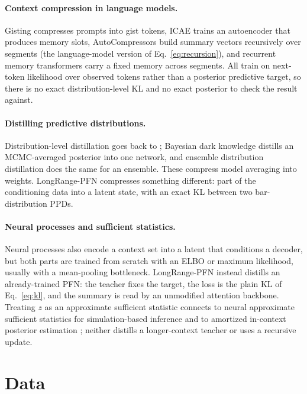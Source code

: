 \documentclass{article}
\begin{document}
\paragraph{Context compression in language models.} Gisting
\citep{mu2023gisting} compresses prompts into gist tokens, ICAE
\citep{ge2023icae} trains an autoencoder that produces memory slots,
AutoCompressors \citep{chevalier2023autocompressors} build summary vectors
recursively over segments (the language-model version of
Eq.~\eqref{eq:recursion}), and recurrent memory transformers
\citep{bulatov2022rmt} carry a fixed memory across segments. All train on
next-token likelihood over observed tokens rather than a posterior
predictive target, so there is no exact distribution-level KL and no exact
posterior to check the result against.

\paragraph{Distilling predictive distributions.} Distribution-level
distillation goes back to \citet{hinton2015distillation}; Bayesian dark
knowledge \citep{korattikara2015darkknowledge} distills an MCMC-averaged
posterior into one network, and ensemble distribution distillation
\citep{malinin2020edd} does the same for an ensemble. These compress model
averaging into weights. LongRange-PFN compresses something different: part
of the conditioning data into a latent state, with an exact KL between two
bar-distribution PPDs.

\paragraph{Neural processes and sufficient statistics.} Neural processes
\citep{garnelo2018np, kim2019anp} also encode a context set into a latent
that conditions a decoder, but both parts are trained from scratch with an
ELBO or maximum likelihood, usually with a mean-pooling bottleneck.
LongRange-PFN instead distills an already-trained PFN: the teacher fixes
the target, the loss is the plain KL of Eq.~\eqref{eq:kl}, and the summary
is read by an unmodified attention backbone. Treating $z$ as an approximate
sufficient statistic connects to neural approximate sufficient statistics
for simulation-based inference \citep{chen2021nass} and to amortized
in-context posterior estimation \citep{mittal2025amortized}; neither
distills a longer-context teacher or uses a recursive update.

\section{Data}
\label{sec:data}
\end{document}

